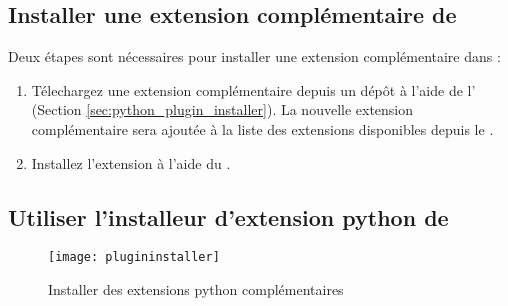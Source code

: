 \subsection{Installer une extension complémentaire de \qg}\label{sec:load_external_plugin} 

Deux étapes sont nécessaires pour installer une extension complémentaire dans \qg :

\begin{enumerate}
\item Télechargez une extension complémentaire depuis un dépôt à l'aide de l' (Section \ref{sec:python_plugin_installer}).
La nouvelle extension complémentaire sera ajoutée à la liste des extensions disponibles depuis le .
\item Installez l'extension à l'aide du .
\end{enumerate}

\subsection{Utiliser l'installeur d'extension python de \qg}\label{sec:python_plugin_installer}

\begin{figure}[ht]
   \begin{center}
   \texttt{[image: plugininstaller]}
   \caption{Installer des extensions python complémentaires\nixcaption}
\label{fig:plugininstaller}
\end{center}
\end{figure}

